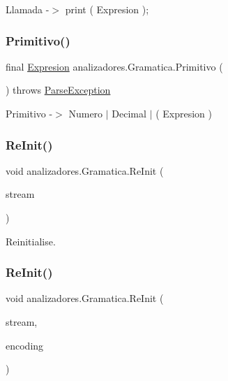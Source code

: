 Llamada -\/$>$ print ( Expresion ); \mbox{\label{classanalizadores_1_1_gramatica_ab82d652de277a9f80090631b30637b09}} 
\subsubsection{\texorpdfstring{Primitivo()}{Primitivo()}}
{\footnotesize\ttfamily final \mbox{\hyperlink{interfaceast_1_1_expresion}{Expresion}} analizadores.\+Gramatica.\+Primitivo (\begin{DoxyParamCaption}{ }\end{DoxyParamCaption}) throws \mbox{\hyperlink{classanalizadores_1_1_parse_exception}{Parse\+Exception}}}

Primitivo -\/$>$ Numero $\vert$ Decimal $\vert$ \textquotesingle{}(\textquotesingle{} Expresion \textquotesingle{})\textquotesingle{} \mbox{\label{classanalizadores_1_1_gramatica_a2e933863c9692a4f638603bb43e87d14}} 
\subsubsection{\texorpdfstring{Re\+Init()}{ReInit()}\hspace{0.1cm}{\footnotesize\ttfamily [1/4]}}
{\footnotesize\ttfamily void analizadores.\+Gramatica.\+Re\+Init (\begin{DoxyParamCaption}\item[{java.\+io.\+Input\+Stream}]{stream }\end{DoxyParamCaption})}

Reinitialise. \mbox{\label{classanalizadores_1_1_gramatica_a68a64ba7053949788dbe012722aea06b}} 
\subsubsection{\texorpdfstring{Re\+Init()}{ReInit()}\hspace{0.1cm}{\footnotesize\ttfamily [2/4]}}
{\footnotesize\ttfamily void analizadores.\+Gramatica.\+Re\+Init (\begin{DoxyParamCaption}\item[{java.\+io.\+Input\+Stream}]{stream,  }\item[{String}]{encoding }\end{DoxyParamCaption})}

